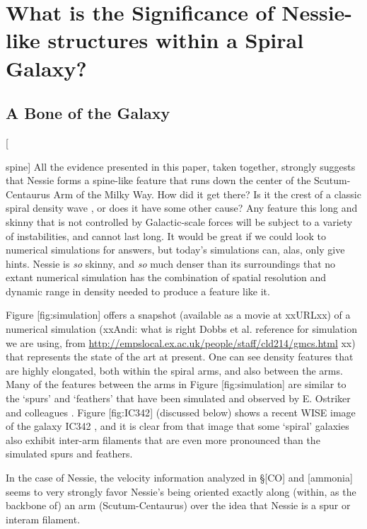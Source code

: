 \documentclass[]{article}
\begin{document}
\section{What is the Significance of Nessie-like structures within a
Spiral Galaxy?}

\subsection{A Bone of the Galaxy}

{[}

spine{]} All the evidence presented in this paper, taken together,
strongly suggests that Nessie forms a spine-like feature that runs down
the center of the Scutum-Centaurus Arm of the Milky Way. How did it get
there? Is it the crest of a classic spiral density wave \citep{Lin1964},
or does it have some other cause? Any feature this long and skinny that
is not controlled by Galactic-scale forces will be subject to a variety
of instabilities, and cannot last long. It would be great if we could
look to numerical simulations for answers, but today's simulations can,
alas, only give hints. Nessie is \emph{so} skinny, and \emph{so} much
denser than its surroundings that no extant numerical simulation has the
combination of spatial resolution and dynamic range in density needed to
produce a feature like it.

Figure {[}fig:simulation{]} offers a snapshot (available as a movie at
xxURLxx) of a numerical simulation (xxAndi: what is right Dobbs et al.
reference for simulation we are using, from
\url{http://empslocal.ex.ac.uk/people/staff/cld214/gmcs.html} xx) that
represents the state of the art at present. One can see density features
that are highly elongated, both within the spiral arms, and also between
the arms. Many of the features between the arms in Figure
{[}fig:simulation{]} are similar to the `spurs' and `feathers' that have
been simulated and observed by E. Ostriker and colleagues
\citep{Shetty2006, Vigne2008, Corder2008}. Figure {[}fig:IC342{]}
(discussed below) shows a recent WISE image of the galaxy IC342
\citep{Jarrett2013}, and it is clear from that image that some `spiral'
galaxies also exhibit inter-arm filaments that are even more pronounced
than the simulated spurs and feathers.

In the case of Nessie, the velocity information analyzed in §{[}CO{]}
and {[}ammonia{]} seems to very strongly favor Nessie's being oriented
exactly along (within, as the backbone of) an arm (Scutum-Centaurus)
over the idea that Nessie is a spur or interam filament.
\end{document}
